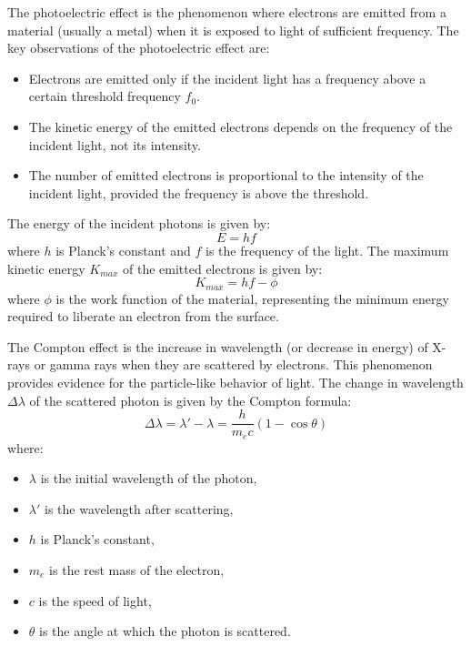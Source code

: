 \documentclass[11pt]{report}
\begin{document}
\begin{definition}
    The photoelectric effect is the phenomenon where electrons are emitted from a material (usually a metal) when it is exposed to light of sufficient frequency. The key observations of the photoelectric effect are:
    \begin{itemize}
        \item Electrons are emitted only if the incident light has a frequency above a certain threshold frequency \( f_0 \).
        \item The kinetic energy of the emitted electrons depends on the frequency of the incident light, not its intensity.
        \item The number of emitted electrons is proportional to the intensity of the incident light, provided the frequency is above the threshold.
    \end{itemize}
    The energy of the incident photons is given by:
    $$
        E = h f
    $$
    where \( h \) is Planck's constant and \( f \) is the frequency of the light. The maximum kinetic energy \( K_{max} \) of the emitted electrons is given by:
    $$
        K_{max} = h f - \phi
    $$
    where \( \phi \) is the work function of the material, representing the minimum energy required to liberate an electron from the surface.
    
\end{definition}

\begin{definition}
    The Compton effect is the increase in wavelength (or decrease in energy) of X-rays or gamma rays when they are scattered by electrons. This phenomenon provides evidence for the particle-like behavior of light. The change in wavelength \( \Delta \lambda \) of the scattered photon is given by the Compton formula:
    \begin{equation}
        \Delta \lambda = \lambda' - \lambda = \frac{h}{m_e c} (1 - \cos \theta)
    \end{equation}
    where:
    \begin{itemize}
        \item \( \lambda \) is the initial wavelength of the photon,
        \item \( \lambda' \) is the wavelength after scattering,
        \item \( h \) is Planck's constant,
        \item \( m_e \) is the rest mass of the electron,
        \item \( c \) is the speed of light,
        \item \( \theta \) is the angle at which the photon is scattered.
    \end{itemize}
    
\end{definition}
\end{document}
